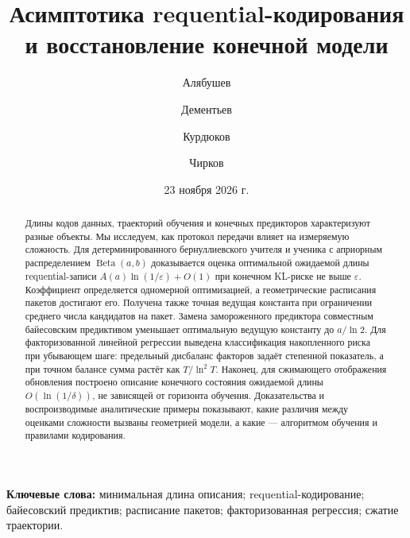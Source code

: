 \documentclass[11pt,a4paper]{article}
\title{Асимптотика requential-кодирования\\и восстановление конечной модели}
\author{Алябушев \and Дементьев \and Курдюков \and Чирков}
\date{23 ноября 2026 г.}
\theoremstyle{definition}
\theoremstyle{remark}
\newcommand{\Beta}{\operatorname{Beta}}
\begin{document}
\maketitle
\begin{abstract}
Длины кодов данных, траекторий обучения и конечных предикторов характеризуют
разные объекты. Мы исследуем, как протокол передачи влияет на измеряемую
сложность. Для детерминированного бернуллиевского учителя и ученика с априорным
распределением $\Beta(a,b)$ доказывается оценка оптимальной ожидаемой длины
requential-записи $A(a)\ln(1/\varepsilon)+O(1)$ при конечном KL-риске не выше
$\varepsilon$. Коэффициент определяется одномерной оптимизацией, а геометрические
расписания пакетов достигают его. Получена также точная ведущая константа при
ограничении среднего числа кандидатов на пакет. Замена замороженного предиктора
совместным байесовским предиктивом уменьшает оптимальную ведущую константу до
$a/\ln 2$. Для факторизованной линейной регрессии выведена классификация
накопленного риска при убывающем шаге: предельный дисбаланс факторов задаёт
степенной показатель, а при точном балансе сумма растёт как $T/\ln^2 T$.
Наконец, для сжимающего отображения обновления построено описание конечного
состояния ожидаемой длины $O(\ln(1/\delta))$, не зависящей от горизонта обучения.
Доказательства и воспроизводимые аналитические примеры показывают, какие
различия между оценками сложности вызваны геометрией модели, а какие ---
алгоритмом обучения и правилами кодирования.
\end{abstract}
\noindent\textbf{Ключевые слова:} минимальная длина описания; requential-кодирование;
байесовский предиктив; расписание пакетов; факторизованная регрессия;
сжатие траектории.










\end{document}
